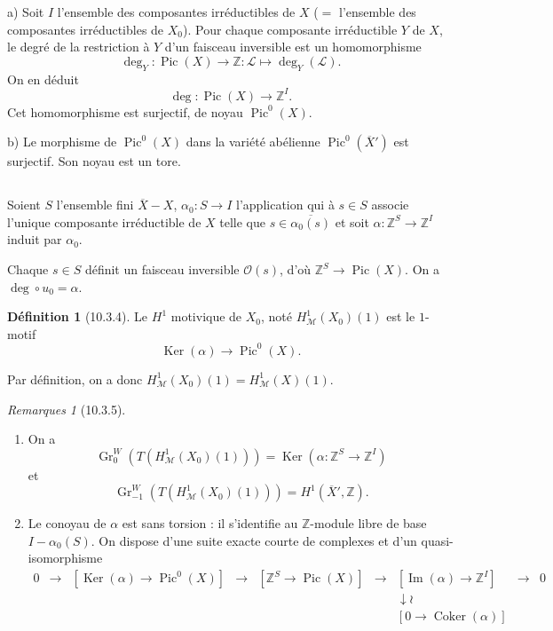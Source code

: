 \documentclass[12pt,a4paper]{amsart}
\theoremstyle{plain}
\theoremstyle{definition}
\newtheorem{definition}[lemme]{Définition}
\theoremstyle{remark}
\newtheorem{remarques}[lemme]{Remarques}
\DeclareMathOperator{\Ker}{Ker}
\DeclareMathOperator{\Ime}{Im}
\DeclareMathOperator{\Coker}{Coker}
\DeclareMathOperator{\Pic}{Pic}
\DeclareMathOperator{\Gr}{Gr}
\DeclareMathOperator{\deg}{deg}
\numberwithin{equation}{section}
\begin{document}
a) Soit $I$ l'ensemble des composantes irréductibles de $X$ ($=$ l'ensemble des composantes irréductibles de $X_0$). Pour chaque composante irréductible $Y$ de $X$, le degré de la restriction à $Y$ d'un faisceau inversible est un homomorphisme
\[
\deg_Y:\Pic(X)\to\mathbb{Z}:\mathscr{L}\mapsto\deg_Y(\mathscr{L}).
\]
On en déduit
\[
\deg:\Pic(X)\to\mathbb{Z}^I.
\]
Cet homomorphisme est surjectif, de noyau $\Pic^0(X)$.

b) Le morphisme de $\Pic^0(X)$ dans la variété abélienne $\Pic^0(\overline{X}')$ est surjectif. Son noyau est un tore.

\subsection{}\label{10.3.3}
Soient $S$ l'ensemble fini $\overline{X}-X$, $\alpha_0:S\to I$ l'application qui à $s\in S$ associe l'unique composante irréductible de $X$ telle que $s\in\overline{\alpha_0(s)}$ et soit $\alpha:\mathbb{Z}^S\to\mathbb{Z}^I$ induit par $\alpha_0$.

Chaque $s\in S$ définit un faisceau inversible $\mathcal{O}(s)$, d'où $\mathbb{Z}^S\to\Pic(X)$. On a $\deg\circ u_0=\alpha$.

\begin{definition}[10.3.4]\label{def:10.3.4}
Le $H^1$ motivique de $X_0$, noté $H_\mathscr{M}^1(X_0)(1)$ est le $1$-motif
\[
\Ker(\alpha)\to\Pic^0(X).
\]
\end{definition}

Par définition, on a donc $H_\mathscr{M}^1(X_0)(1)=H_\mathscr{M}^1(X)(1)$.

\begin{remarques}[10.3.5]\label{rem:10.3.5}
\begin{enumerate}
\item[(i)] On a
\[
\Gr_0^W(T(H_\mathscr{M}^1(X_0)(1)))=\Ker(\alpha:\mathbb{Z}^S\to\mathbb{Z}^I)
\]
et
\[
\Gr_{-1}^W(T(H_\mathscr{M}^1(X_0)(1)))=H^1(\overline{X}',\mathbb{Z}).
\]

\item[(ii)] Le conoyau de $\alpha$ est sans torsion : il s'identifie au $\mathbb{Z}$-module libre de base $I-\alpha_0(S)$. On dispose d'une suite exacte courte de complexes et d'un quasi-isomorphisme
\[
\begin{array}{ccccccccc}
0 & \longrightarrow & [\Ker(\alpha)\to\Pic^0(X)] & \longrightarrow & [\mathbb{Z}^S\to\Pic(X)] & \longrightarrow & [\Ime(\alpha)\to\mathbb{Z}^I] & \longrightarrow & 0 \\
 & & & & & & \downarrow\wr & & \\
 & & & & & & [0\to\Coker(\alpha)] & &
\end{array}
\]
\end{enumerate}
\end{remarques}
\end{document}
